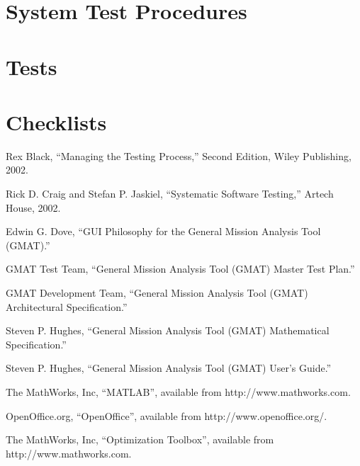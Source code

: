 \documentclass[10 pt]{book}
\begin{document}


\part{System Test Procedures}
\thispagestyle{empty}









\part{Tests}





\part{Checklists}



%
%
%
%
%
%
%
%
\backmatter

\begin{thebibliography}{poseidon} %

 Rex Black, ``Managing the Testing Process,'' Second Edition, Wiley
Publishing, 2002.

 Rick D. Craig and Stefan P. Jaskiel, ``Systematic Software Testing,'' Artech
House, 2002.

 Edwin G. Dove, ``GUI Philosophy for the General Mission Analysis Tool
(GMAT).''

 GMAT Test Team, ``General Mission Analysis Tool (GMAT) Master Test Plan.''

 GMAT Development Team, ``General Mission Analysis Tool (GMAT) Architectural
Specification.''

 Steven P. Hughes, ``General Mission Analysis Tool (GMAT) Mathematical
Specification.''

 Steven P. Hughes, ``General Mission Analysis Tool (GMAT) User's Guide.''

 The MathWorks, Inc, ``MATLAB'', available from http://www.mathworks.com.

 OpenOffice.org, ``OpenOffice'', available from http://www.openoffice.org/.

 The MathWorks, Inc, ``Optimization Toolbox'', available from
http://www.mathworks.com.


\end{thebibliography}
\end{document}
